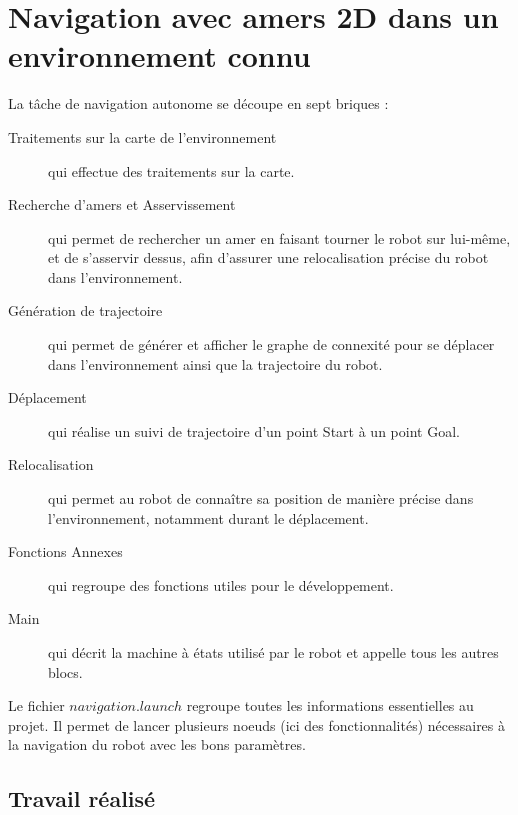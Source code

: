 \documentclass[10pt,a4paper]{article}
\begin{document}
\section{Navigation avec amers 2D dans un environnement connu}
\label{sec:navigation_avec_amers_2D_dans_un_environnement_connu}

La tâche de navigation autonome se découpe en sept briques : 
\begin{description}
\item [Traitements sur la carte de l'environnement] qui effectue des traitements sur la carte.
\item [Recherche d'amers et Asservissement] qui permet de rechercher un amer en faisant tourner le robot sur lui-même, et de s'asservir dessus, afin d'assurer une relocalisation précise du robot dans l'environnement.
\item [Génération de trajectoire] qui permet de générer et afficher le graphe de connexité pour se déplacer dans l'environnement ainsi que la trajectoire du robot.
\item [Déplacement] qui réalise un suivi de trajectoire d'un point Start à un point Goal.
\item [Relocalisation] qui permet au robot de connaître sa position de manière précise dans l'environnement, notamment durant le déplacement.
\item [Fonctions Annexes] qui regroupe des fonctions utiles pour le développement.
\item [Main] qui décrit la machine à états utilisé par le robot et appelle tous les autres blocs.
\end{description}


Le fichier $navigation.launch$ regroupe toutes les informations essentielles au projet. Il permet de lancer plusieurs noeuds (ici des fonctionnalités) nécessaires à la navigation du robot avec les bons paramètres.


\subsection{Travail réalisé}
\label{sec:travail_realise}
\end{document}
